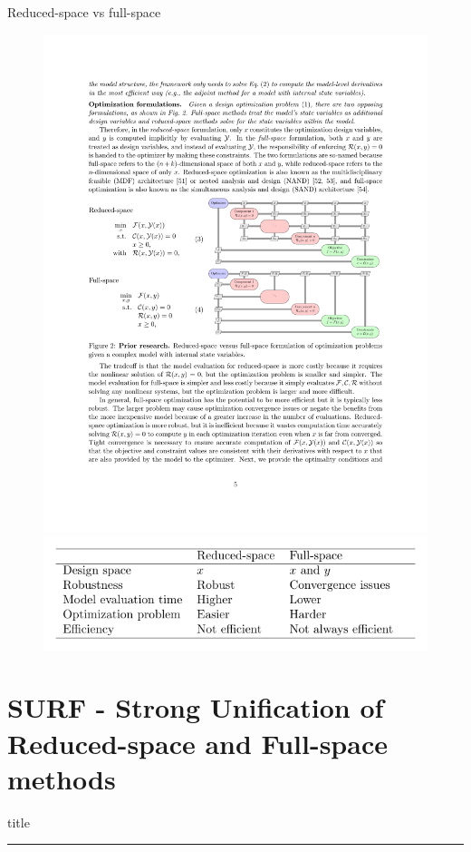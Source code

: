\documentclass{beamer}
\begin{document}
  \begin{frame}{Reduced-space vs full-space}
    \begin{figure}[ht]
      \centering
      \vspace{0mm}
      \includegraphics[width=.7\linewidth]{Figures/Figure2}
      \includegraphics[width=.9\linewidth]{Figures/rs_vs_fs_table}
      \vspace{0mm}
      \label{fig:model_evals}
    \end{figure}
  \end{frame}


\section{SURF - Strong Unification of Reduced-space and Full-space methods}
    \begin{frame}[plain]
        \vfill
      \centering
      \begin{beamercolorbox}[sep=8pt,center,shadow=true,rounded=true]{title}
        \insertsectionhead\par%
        \color{oxfordblue}\noindent\rule{10cm}{1pt} \\
        \LARGE{\faFileTextO}
      \end{beamercolorbox}
      \vfill
  \end{frame}
\end{document}
